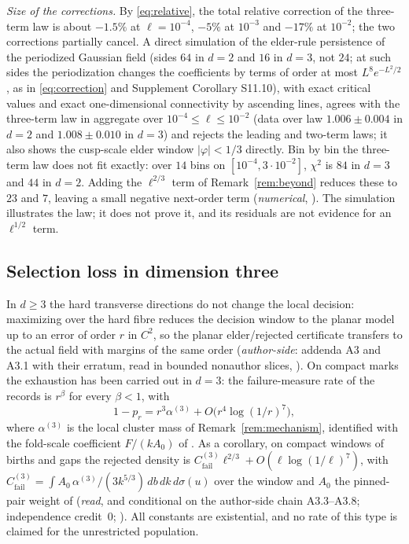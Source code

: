 \emph{Size of the corrections.} By \eqref{eq:relative}, the total relative correction of the three-term law is about $-1.5\%$ at $\ell=10^{-4}$, $-5\%$ at $10^{-3}$ and $-17\%$ at $10^{-2}$; the two corrections partially cancel. A direct simulation of the elder-rule persistence of the periodized Gaussian field (sides $64$ in $d=2$ and $16$ in $d=3$, not $24$; at such sides the periodization changes the coefficients by terms of order at most $L^8e^{-L^2/2}$, as in \eqref{eq:correction} and Supplement Corollary S11.10), with exact critical values and exact one-dimensional connectivity by ascending lines, agrees with the three-term law in aggregate over $10^{-4}\le\ell\le10^{-2}$ (data over law $1.006\pm0.004$ in $d=2$ and $1.008\pm0.010$ in $d=3$) and rejects the leading and two-term laws; it also shows the cusp-scale elder window $|\varphi|<1/3$ directly. Bin by bin the three-term law does not fit exactly: over $14$ bins on $[10^{-4},3\cdot10^{-2}]$, $\chi^2$ is $84$ in $d=3$ and $44$ in $d=2$. Adding the $\ell^{2/3}$ term of Remark~\ref{rem:beyond} reduces these to $23$ and $7$, leaving a small negative next-order term (\emph{numerical}, ). The simulation illustrates the law; it does not prove it, and its residuals are not evidence for an $\ell^{1/2}$ term.

\subsection{Selection loss in dimension three}\label{ssec:d3selection}
In $d\ge3$ the hard transverse directions do not change the local decision: maximizing over the hard fibre reduces the decision window to the planar model up to an error of order $r$ in $C^2$, so the planar elder/rejected certificate transfers to the actual field with margins of the same order (\emph{author-side}: addenda A3 and A3.1 with their erratum, read in bounded nonauthor slices, ). On compact marks the exhaustion has been carried out in $d=3$: the failure-measure rate of the records is $r^\beta$ for every $\beta<1$, with
\[
1-p_r=r^3\alpha^{(3)}+O\bigl(r^4\log(1/r)^7\bigr),
\]
where $\alpha^{(3)}$ is the local cluster mass of Remark~\ref{rem:mechanism}, identified with the fold-scale coefficient $F/(kA_0)$ of . As a corollary, on compact windows of births and gaps the rejected density is $C^{(3)}_{\mathrm{fail}}\ell^{2/3}+O(\ell\log(1/\ell)^7)$, with $C^{(3)}_{\mathrm{fail}}=\int A_0\,\alpha^{(3)}/(3k^{5/3})\,db\,dk\,d\sigma(u)$ over the window and $A_0$ the pinned-pair weight of  (\emph{read}, and conditional on the author-side chain A3.3--A3.8; independence credit~0; ). All constants are existential, and no rate of this type is claimed for the unrestricted population.


